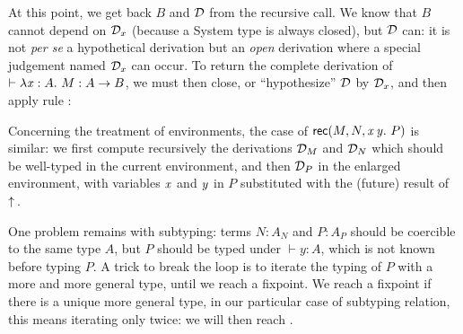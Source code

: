 \documentclass{llncs}
\begin{document}
At this point, we get back $B$ and $\mathcal D$ from the recursive call. We
know that $B$ cannot depend on $\mathcal D_x$ (because a System
 type is always closed), but $\mathcal D$ can: it is not
\emph{per se} a hypothetical derivation but an \emph{open} derivation
where a special judgement named $\mathcal D_x$ can occur. To return the
complete derivation of $\vdash\lambda{\ensuremath{\text{\textit{x}}}}:{A}.\  M : A \to B$, we must then
close, or ``hypothesize'' $\mathcal D$ by $\mathcal D_x$, and then apply rule
:

\begin{mathleft}
  \quad\quad
  {}
\end{mathleft}

Concerning the treatment of environments, the case of $\text{\textsf{rec}}({M},{N},{\text{\textit{x}}}\,{\text{\textit{y}}}.\ {P})$ is similar: we first compute recursively the derivations $\mathcal D_M$
and $\mathcal D_N$ which should be well-typed in the current environment, and
then $\mathcal D_P$ in the enlarged environment, with variables $\text{\textit{x}}$ and
$\text{\textit{y}}$ in $P$ substituted with the (future) result of $\uparrow\!{}$.

One problem remains with subtyping: terms $N : A_N$ and $P : A_P$
should be coercible to the same type $A$, but $P$ should be typed
under $\vdash y:A$, which is not known before typing $P$. A trick to
break the loop is to iterate the typing of $P$ with a more and more
general type, until we reach a fixpoint. We reach a fixpoint if there
is a unique more general type, in our particular case of subtyping
relation, this means iterating only twice: we will then reach
.
\end{document}
